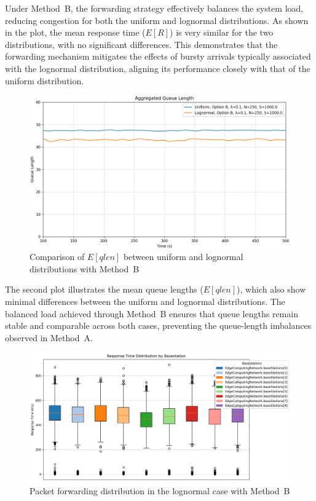 \documentclass{report}
\begin{document}
Under Method~B, the forwarding strategy effectively balances the system load, reducing congestion for both the uniform and lognormal distributions.
As shown in the plot, the mean response time ($E[R]$) is very similar for the two distributions, with no significant differences.
This demonstrates that the forwarding mechanism mitigates the effects of bursty arrivals typically associated with the lognormal distribution, aligning its performance closely with that of the uniform distribution.

\begin{figure}[H]
    \centering
    \includegraphics[width=\textwidth]{img/plots/I-vary/Q_B_I01.png}
    \caption{Comparison of $E[qlen]$ between uniform and lognormal distributions with Method~B}
\end{figure}

\begin{flushleft}
The second plot illustrates the mean queue lengths ($E[qlen]$), which also show minimal differences between the uniform and lognormal distributions. The balanced load achieved through Method~B ensures that queue lengths remain stable and comparable across both cases, preventing the queue-length imbalances observed in Method~A.
\end{flushleft}

\begin{figure}[H]
    \centering
    \includegraphics[width=\textwidth]{img/plots/I-vary/Q_Box_Log_B_I01.png}
    \caption{Packet forwarding distribution in the lognormal case with Method~B}
\end{figure}
\end{document}
